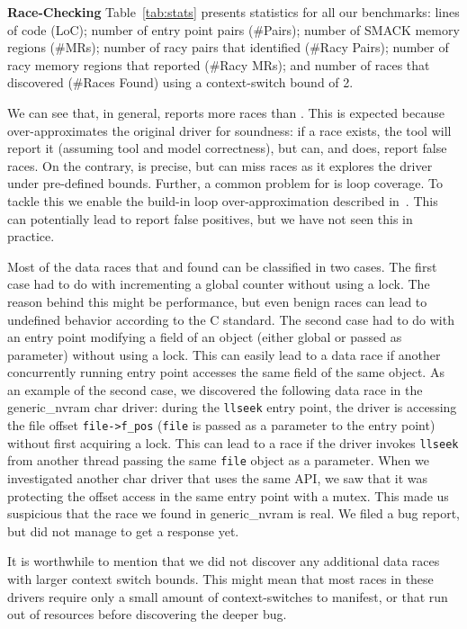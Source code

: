\noindent
\textbf{Race-Checking}\xspace\xspace Table~\ref{tab:stats} presents statistics for all our benchmarks: lines of code (LoC); number of entry point pairs (\#Pairs); number of SMACK memory regions (\#MRs); number of racy pairs that \whoop identified (\#Racy Pairs); number of racy memory regions that \whoop reported (\#Racy MRs); and number of races that \corral discovered (\#Races Found) using a context-switch bound of 2.

We can see that, in general, \whoop reports more races than \corral. This is expected because \whoop over-approximates the original driver for soundness: if a race exists, the tool will report it (assuming tool and model correctness), but \whoop can, and does, report false races. On the contrary, \corral is precise, but can miss races as it explores the driver under pre-defined bounds. Further, a common problem for \corral is loop coverage. To tackle this we enable the build-in loop over-approximation described in~\cite{lal2014powering}. This can potentially lead \corral to report false positives, but we have not seen this in practice.

Most of the data races that \whoop and \corral found can be classified in two cases. The first case had to do with incrementing a global counter without using a lock. The reason behind this might be performance, but even benign races can lead to undefined behavior according to the C standard. The second case had to do with an entry point modifying a field of an object (either global or passed as parameter) without using a lock. This can easily lead to a data race if another concurrently running entry point accesses the same field of the same object. As an example of the second case, we discovered the following data race in the generic\_nvram char driver: during the \texttt{llseek} entry point, the driver is accessing the file offset \texttt{file->f\_pos} (\texttt{file} is passed as a parameter to the entry point) without first acquiring a lock. This can lead to a race if the driver invokes \texttt{llseek} from another thread passing the same \texttt{file} object as a parameter. When we investigated another char driver that uses the same API, we saw that it was protecting the offset access in the same entry point with a mutex. This made us suspicious that the race we found in generic\_nvram is real. We filed a bug report, but did not manage to get a response yet.

It is worthwhile to mention that we did not discover any additional data races with larger context switch bounds. This might mean that most races in these drivers require only a small amount of context-switches to manifest, or that \corral run out of resources before discovering the deeper bug.

